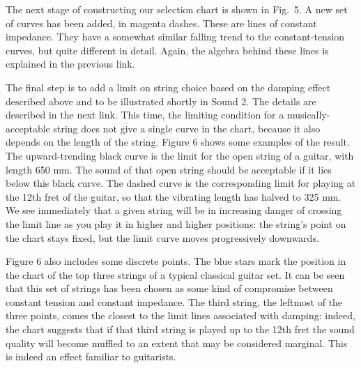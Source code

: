   The next stage of constructing our selection chart is shown in Fig.\ 5. A new 
  set of curves has been added, in magenta dashes. These are lines of constant 
  impedance. They have a somewhat similar falling trend to the constant-tension 
  curves, but quite different in detail. Again, the algebra behind these lines 
  is explained in the previous link. 


  The final step is to add a limit on string choice based on the damping effect 
  described above and to be illustrated shortly in Sound 2. The details are 
  described in the next link. This time, the limiting condition for a 
  musically-acceptable string does not give a single curve in the chart, 
  because it also depends on the length of the string. Figure 6 shows some 
  examples of the result. The upward-trending black curve is the limit for the 
  open string of a guitar, with length 650 mm. The sound of that open string 
  should be acceptable if it lies below this black curve. The dashed curve is 
  the corresponding limit for playing at the 12th fret of the guitar, so that 
  the vibrating length has halved to 325 mm. We see immediately that a given 
  string will be in increasing danger of crossing the limit line as you play it 
  in higher and higher positions: the string's point on the chart stays fixed, 
  but the limit curve moves progressively downwards. 


  Figure 6 also includes some discrete points. The blue stars mark the position 
  in the chart of the top three strings of a typical classical guitar set. It 
  can be seen that this set of strings has been chosen as some kind of 
  compromise between constant tension and constant impedance. The third string, 
  the leftmost of the three points, comes the closest to the limit lines 
  associated with damping: indeed, the chart suggests that if that third string 
  is played up to the 12th fret the sound quality will become muffled to an 
  extent that may be considered marginal. This is indeed an effect familiar to 
  guitarists. 

